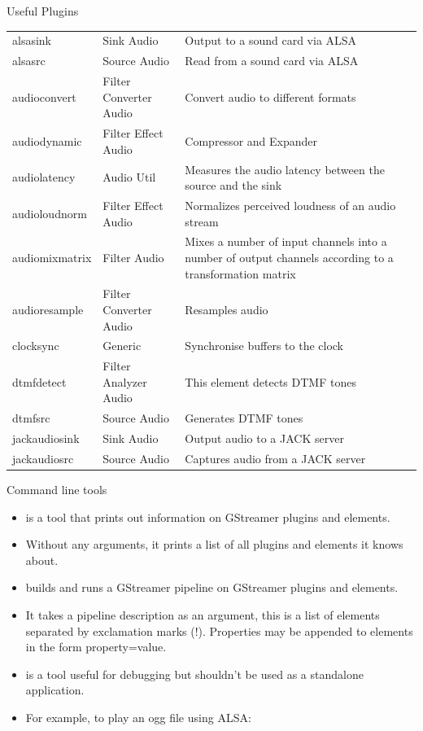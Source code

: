 \begin{frame}{Useful Plugins}
  \begin{center}
  \fontsize{8}{9}\selectfont
  \begin{tabularx}{13cm}{l|l|X}
    alsasink & Sink Audio & Output to a sound card via ALSA \\
    alsasrc & Source Audio & Read from a sound card via ALSA \\
    audioconvert & Filter Converter Audio & Convert audio to different formats \\
    audiodynamic & Filter Effect Audio & Compressor and Expander \\
    audiolatency & Audio Util & Measures the audio latency between the source and the sink \\
    audioloudnorm & Filter Effect Audio & Normalizes perceived loudness of an audio stream \\
    audiomixmatrix & Filter Audio & Mixes a number of input channels
    into a number of output channels according to a transformation
    matrix \\
    audioresample & Filter Converter Audio & Resamples audio \\
    clocksync & Generic &Synchronise buffers to the clock \\
    dtmfdetect & Filter Analyzer Audio & This element detects DTMF tones \\
    dtmfsrc & Source Audio & Generates DTMF tones \\
    jackaudiosink & Sink Audio & Output audio to a JACK server \\
    jackaudiosrc & Source Audio & Captures audio from a JACK server \\
  \end{tabularx}
  \end{center}
\end{frame}

\begin{frame}{Command line tools}
  \begin{itemize}
  \item {} is a tool that prints out information
    on GStreamer plugins and elements.
  \item Without any arguments, it prints a list of all plugins and
    elements it knows about.
  \item {} builds and runs a GStreamer pipeline
    on GStreamer plugins and elements.
  \item It takes a pipeline description as an argument, this is a list
    of elements separated by exclamation marks (!). Properties may be
    appended to elements in the form property=value.
  \item {} is a tool useful for debugging but
    shouldn't be used as a standalone application.
  \item For example, to play an ogg file using ALSA:
  \end{itemize}
\end{frame}

